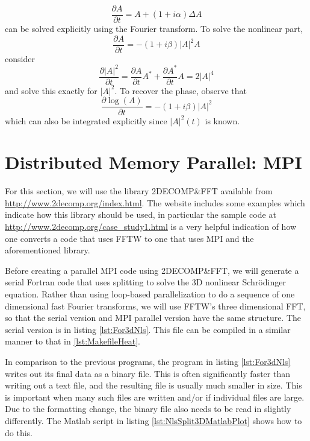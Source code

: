 \begin{enumerate}
$$\frac{\partial A}{\partial t}=A+(1+i\alpha)\Delta A$$
can be solved explicitly using the Fourier transform. To solve the nonlinear part, 
$$\frac{\partial A}{\partial t}=- (1+i\beta)|A|^2A$$
consider
$$\frac{\partial |A|^2}{\partial t}=\frac{\partial A}{\partial t}A^*+\frac{\partial A^*}{\partial t}A=2|A|^4$$
and solve this exactly for $|A|^2$. To recover the phase, observe that
$$\frac{\partial \log(A)}{\partial t}=- (1+i\beta)|A|^2$$
which can also be integrated explicitly since $|A|^2(t)$ is known.


\end{enumerate}

\section{Distributed Memory Parallel: MPI}

For this section, we will use the library 2DECOMP{\&}FFT available from \url{http://www.2decomp.org/index.html}. The website includes some examples which indicate how this library should be used, in particular the sample code at \url{http://www.2decomp.org/case_study1.html} is a very helpful indication of how one converts a code that uses FFTW to one that uses MPI and the aforementioned library.  

Before creating a parallel MPI code using 2DECOMP{\&}FFT, we will generate  a serial Fortran code that uses splitting to solve the 3D nonlinear Schr\"{o}dinger equation. Rather than using loop-based parallelization to do a sequence of one dimensional fast Fourier transforms, we will use FFTW's three dimensional FFT, so that the serial version and MPI parallel version have the same structure. The serial version is in listing \ref{lst:For3dNls}. This file can be compiled in a similar manner to that in \ref{lst:MakefileHeat}.



In comparison to the previous programs, the program in listing \ref{lst:For3dNls} writes out its final data as a binary file. This is often significantly faster than writing out a text file, and the resulting file is usually much smaller in size. This is important when many such files are written and/or if individual files are large. Due to the formatting change, the binary file also needs to be read in slightly differently. The Matlab script in listing \ref{lst:NlsSplit3DMatlabPlot} shows how to do this.


